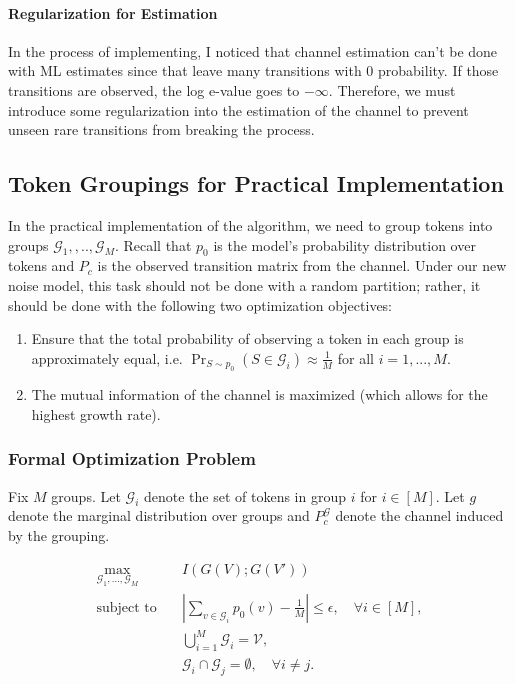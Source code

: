 \documentclass[12pt]{article}
\theoremstyle{plain}
\theoremstyle{definition}
\begin{document}
\paragraph{Regularization for Estimation} In the process of implementing, I noticed that channel estimation can't be done with ML estimates since that leave many transitions with $0$ probability. If those transitions are observed, the log e-value goes to $-\infty$. Therefore, we must introduce some regularization into the estimation of the channel to prevent unseen rare transitions from breaking the process.

\subsection{Token Groupings for Practical Implementation}
\label{sec:token_groupings}
In the practical implementation of the algorithm, we need to group tokens into groups $\mathcal{G}_1,,..,\mathcal{G}_M$. Recall that $p_0$ is the model's probability distribution over tokens and $P_c$ is the observed transition matrix from the channel. Under our new noise model, this task should not be done with a random partition; rather, it should be done with the following two optimization objectives:
\begin{enumerate}
    \item Ensure that the total probability of observing a token in each group is approximately equal, i.e. $\Pr_{S\sim p_0}(S\in\mathcal{G}_i)\approx \frac{1}{M}$ for all $i=1,...,M$.
    \item The mutual information of the channel is maximized (which allows for the highest growth rate). 
\end{enumerate}

\subsubsection{Formal Optimization Problem}
Fix $M$ groups. Let $\mathcal{G}_i$ denote the set of tokens in group $i$ for $i\in [M]$. Let $g$ denote the marginal distribution over groups and $P_c^\mathcal{G}$ denote the channel induced by the grouping.



\begin{align}
    \max_{\mathcal{G}_1,\ldots,\mathcal{G}_M}
    \quad &
    I(G(V);G(V')) \\
    \text{subject to} \quad
    & \left|
        \sum_{v\in\mathcal{G}_i}p_0(v)
        -\frac{1}{M}
      \right| \leq \epsilon,
      \quad \forall i\in[M], \nonumber\\
    & \bigcup_{i=1}^M\mathcal{G}_i=\mathcal V,
      \nonumber\\
    & \mathcal{G}_i\cap\mathcal{G}_j=\emptyset,
      \quad \forall i\neq j. \nonumber
\end{align}
\end{document}
